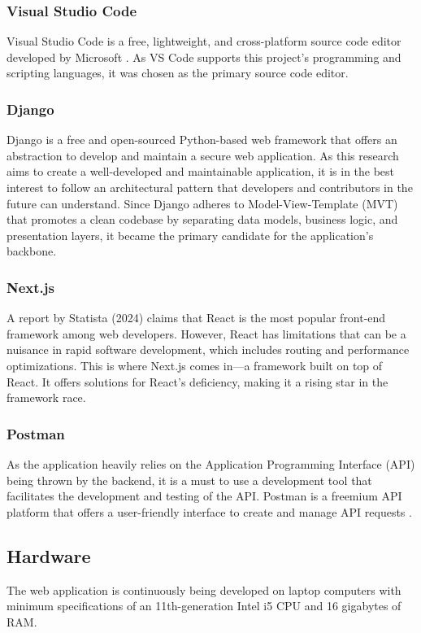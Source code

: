 \subsubsection{Visual Studio Code}
Visual Studio Code is a free, lightweight, and cross-platform source code editor developed by Microsoft \cite{vscode-2021}. As VS Code supports this project's programming and scripting languages, it was chosen as the primary source code editor.

\subsubsection{Django}
Django is a free and open-sourced Python-based web framework that offers an abstraction to develop and maintain a secure web application. As this research aims to create a well-developed and maintainable application, it is in the best interest to follow an architectural pattern that developers and contributors in the future can understand. Since Django adheres to Model-View-Template (MVT) that promotes a clean codebase by separating data models, business logic, and presentation layers, it became the primary candidate for the application's backbone. 


\subsubsection{Next.js}
A report by Statista (2024) claims that React is the most popular front-end framework among web developers. However, React has limitations that can be a nuisance in rapid software development, which includes routing and performance optimizations. This is where Next.js comes in—a framework built on top of React. It offers solutions for React's deficiency, making it a rising star in the framework race. 

\subsubsection{Postman}
As the application heavily relies on the Application Programming Interface (API) being thrown by the backend, it is a must to use a development tool that facilitates the development and testing of the API. Postman is a freemium API platform that offers a user-friendly interface to create and manage API requests \cite{postman-no-date}. 

\subsection{Hardware}
The web application is continuously being developed on laptop computers with minimum specifications of an 11th-generation Intel i5 CPU and 16 gigabytes of RAM.

